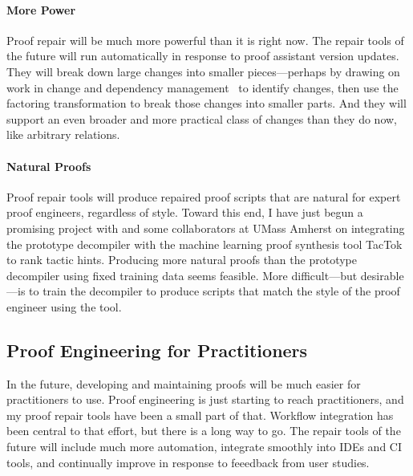 \paragraph{More Power} 
Proof repair will be much more powerful than it is right now.
The repair tools of the future will run automatically in response to proof assistant version updates.
They will break down large changes into smaller pieces---perhaps by drawing on work in change and 
dependency management~\cite{873647, Autexier:2010:CMH:1986659.1986663, Celik:2017:IRP:3155562.3155588} to identify changes, then use the factoring transformation
to break those changes into smaller parts.
And they will support an even broader and more practical class of changes than they do now,
like arbitrary relations.

\paragraph{Natural Proofs}
Proof repair tools will produce repaired proof scripts that are natural for expert proof engineers, regardless of style.
Toward this end, I have just begun a promising project with  and some collaborators at UMass Amherst
on integrating the prototype decompiler with the machine learning proof synthesis tool TacTok~\cite{10.1145/3428299} to rank tactic hints.
Producing more natural proofs than the prototype decompiler using fixed training data seems feasible.
More difficult---but desirable---is to train the decompiler to produce scripts that match the style of the proof engineer using the tool.

\subsection*{Proof Engineering for Practitioners}

In the future, developing and maintaining proofs will be much easier for practitioners to use.
Proof engineering is just starting to reach practitioners, and my proof repair tools have been a small part of that.
Workflow integration has been central to that effort, but there is a long way to go.
The repair tools of the future will include much more automation,
integrate smoothly into IDEs and CI tools,
and continually improve in response to feeedback from user studies.

